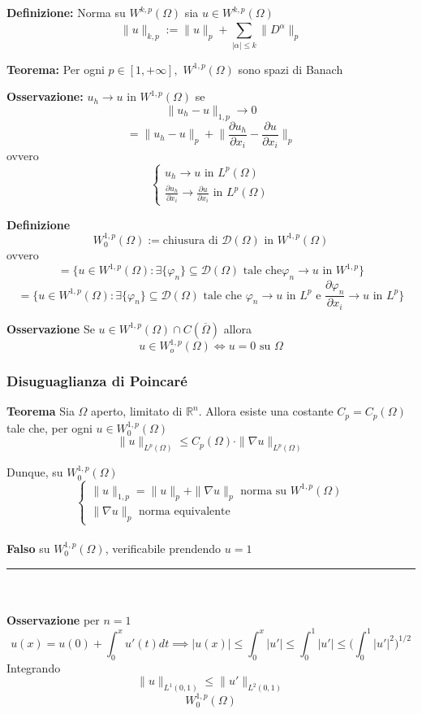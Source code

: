 \documentclass[a4paper]{article}
\newcommand{\R}{\mathbb{R}}
\newcommand{\divider}{\noindent\rule{\textwidth}{0.5pt}}
\begin{document}
\begin{tcolorbox}
	\textbf{Definizione:} Norma su $W^{k,p}(\Omega)$ sia $u\in W^{k,p}(\Omega)$ 
	\[\|u\|_{k,p}:=\|u\|_p+\sum_{|\alpha|\le k}^{}\|D^\alpha\|_p \]
\end{tcolorbox}
\begin{tcolorbox}
	\textbf{Teorema: }Per ogni $p\in [1,+\infty],$ $W^{1,p}(\Omega)$ sono spazi di Banach
\end{tcolorbox}
\textbf{Osservazione:} $u_h\to u$ in $W^{1,p}(\Omega)$ se
\[\|u_h-u\|_{1,p}\to 0\]\[=\|u_h-u\|_p+\bigg\| \frac{\partial u_h}{\partial x_i} -\frac{\partial u}{\partial x_i} \bigg\|_p\]
ovvero
\[\begin{cases}
	u_h\to u\text{ in }L^{p}(\Omega)\\
\frac{\partial u_h}{\partial x_i} \to \frac{\partial u}{\partial x_i} \text{ in }L^{p}(\Omega)
\end{cases}\]

\begin{tcolorbox}
\textbf{Definizione}
\[W_0^{1,p}(\Omega):=\text{chiusura di }\mathcal D(\Omega)\text{ in }W^{1,p}(\Omega)\]
ovvero
\[=\{u\in W^{1,p}(\Omega):\exists \{\varphi_n\}\subseteq  \mathcal D(\Omega)\text{ tale che}\varphi_n\to u\text{ in }W^{1,p} \}\]
\[=\{u\in W^{1,p}(\Omega):\exists \{\varphi_n\} \subseteq  \mathcal D(\Omega)\text{ tale che }\varphi_n\to u \text{ in }L^{p}\text{ e }\frac{\partial \varphi_n}{\partial x_i} \to u\text{ in }L^{p}\}\]
\end{tcolorbox}
\textbf{Osservazione} 
Se $u\in W^{1,p}(\Omega)\cap C(\overline\Omega)$ allora 
\[u\in W_o^{1,p}(\Omega) \iff u=0\text{ su }\Omega\]
\subsubsection{Disuguaglianza di Poincaré}
\begin{tcolorbox}
\textbf{Teorema}
Sia $\Omega$ aperto, limitato di $\R^n$. Allora esiste una costante $C_p=C_p(\Omega)$ tale che, per ogni $u\in W_0^{1,p}(\Omega)$ 
\[\|u\|_{L^{p}(\Omega)}\le C_p(\Omega)\cdot \|\nabla u\|_{L^{p}(\Omega)}\]
\end{tcolorbox}

Dunque, su $W_0^{1,p}(\Omega)$
\[\begin{cases}
	\|u\|_{1,p}=\|u\|_p+\|\nabla u\|_p\text{  norma su }W^{1,p}(\Omega)
\\\|\nabla u\|_p\text{  norma equivalente}
\end{cases}\]
\\\textbf{Falso }su $W_0^{1,p}(\Omega)$, verificabile prendendo $u=1$ 
\\\divider\\
\\\textbf{Osservazione} per $n=1$ 
\[u(x)=u(0)+\int_{0}^{x} u'(t)dt\implies |u(x)|\le \int_{0}^{x} |u'|\le \int_{0}^{1} |u'|\le \bigg(\int_{0}^{1} |u'|^2\bigg)^{1 / 2}\]
Integrando 
\[\|u\|_{L^{1}(0,1)}\le \|u'\|_{L^{2}(0,1)}\]
\[W_0^{1,p}(\Omega)\]
\end{document}
